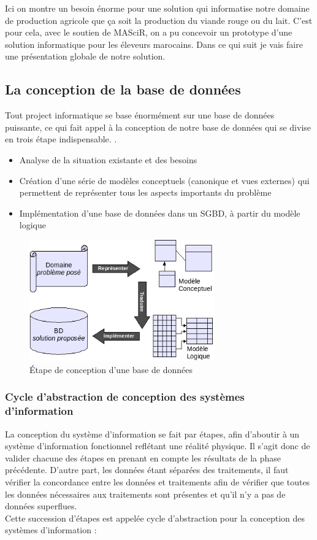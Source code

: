\documentclass[11pt, a4paper, twoside]{book}
\begin{document}
Ici on montre un besoin énorme pour une solution qui informatise notre domaine de production agricole que ça soit la production du viande rouge ou du lait. C'est pour cela, avec le soutien de MASciR, on a pu concevoir un prototype d'une solution informatique pour les éleveurs marocains. Dans ce qui suit je vais faire une présentation globale de notre solution.

\subsection{La conception de la base de données}
Tout project informatique se base énormément sur une base de données puissante, ce qui fait appel à la conception de notre base de données qui se divise en trois étape indispensable.
.
\begin{itemize}
\item Analyse de la situation existante et des besoins
\item Création d'une série de modèles conceptuels (canonique et vues externes) qui permettent de représenter tous les aspects importants du problème
\item Implémentation d'une base de données dans un SGBD, à partir du modèle logique

\end{itemize}

\begin{figure}[H]
\centering
\includegraphics[width=8cm]{db}
\caption{Étape de conception d'une base de données}
\end{figure}

\subsubsection{Cycle d'abstraction de conception des systèmes d'information}
La conception du système d'information se fait par étapes, afin d'aboutir à un système d'information fonctionnel reflétant une réalité physique. Il s'agit donc de valider chacune des étapes en prenant en compte les résultats de la phase précédente. D'autre part, les données étant séparées des traitements, il faut vérifier la concordance entre les données et traitements afin de vérifier que toutes les données nécessaires aux traitements sont présentes et qu'il n'y a pas de données superflues.\\
Cette succession d'étapes est appelée cycle d'abstraction pour la conception des systèmes d'information :
\end{document}
